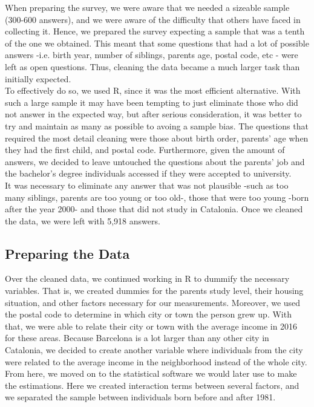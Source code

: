 \documentclass[12pt]{article}
\begin{document}
When preparing the survey, we were aware that we needed a sizeable sample (300-600 answers), and we were aware of the difficulty that others have faced in collecting it. Hence, we prepared the survey expecting a sample that was a tenth of the one we obtained. This meant that some questions that had a lot of possible answers -i.e. birth year, number of siblings, parents age, postal code, etc - were left as open questions. Thus, cleaning the data became a much larger task than initially expected. \\
To effectively do so, we used R, since it was the most efficient alternative. With such a large sample it may have been tempting to just eliminate those who did not answer in the expected way, but after serious consideration, it was better to try and maintain as many as possible to avoing a sample bias. The questions that required the most detail cleaning were those about birth order, parents' age when they had the first child, and postal code. Furthermore, given the amount of answers, we decided to leave untouched the questions about the parents' job and the bachelor's degree individuals accessed if they were accepted to university. \\
It was necessary to eliminate any answer that was not plausible -such as too many siblings, parents are too young or too old-, those that were too young -born after the year 2000- and those that did not study in Catalonia. Once we cleaned the data, we were left with 5,918 answers.

\subsection{Preparing the Data}

Over the cleaned data, we continued working in R to dummify the necessary variables. That is, we created dummies for the parents study level, their housing situation, and other factors necessary for our measurements. Moreover, we used the postal code to determine in which city or town the person grew up. With that, we were able to relate their city or town with the average income in 2016 for these areas. Because Barcelona is a lot larger than any other city in Catalonia, we decided to create another variable where individuals from the city were related to the average income in the neighborhood instead of the whole city.\\
From here, we moved on to the statistical software we would later use to make the estimations. Here we created interaction terms between several factors, and we separated the sample between individuals born before and after 1981. \\
\end{document}
